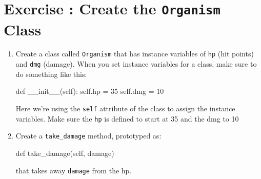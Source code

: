 \documentclass{42-en}
\begin{document}
\startexercices


\chapter{Exercise \exercicenumber: Create the \texttt{Organism} Class}

\exnumber{\exercicenumber}

\makeheaderfiles

   \begin{enumerate}\itemsep7pt
    \item Create a class called \texttt{Organism} that has instance variables of \texttt{hp} (hit points) and \texttt{dmg} (damage).
    When you set instance variables for a class, make sure to do something like this:
           \begin{42pycode}
def __init__(self):
    self.hp = 35
    self.dmg = 10
\end{42pycode}
        Here we're using the \texttt{self} attribute of the class to assign the instance variables. Make sure the \texttt{hp} is defined to start at 35 and the dmg to 10
                \item Create a \texttt{take\_damage} method, prototyped as:
           \begin{42pycode}
def take_damage(self, damage)
\end{42pycode}
that takes away \texttt{damage} from the hp.
\end{enumerate}
\nextexercice
\end{document}
